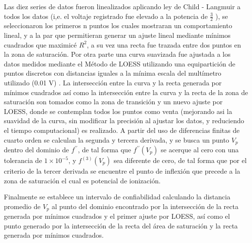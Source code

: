 Las diez series de datos fueron linealizados aplicando ley de Child - Langmuir a todos los datos (i,e. el voltaje registrado fue elevado a la potencia de $\frac{3}{2}$ ), se seleccionaron los primeros n puntos los cuales mostraran un comportamiento lineal, y a la par que permitieran generar un ajuste lineal mediante mínimos cuadrados que maximicé $R^{2}$, a su vez una recta fue trazada entre dos puntos en la zona de saturación. Por otra parte una curva suavizada fue ajustada a los datos medidos mediante el Método de LOESS utilizando una equipartición de puntos discretos con distancias iguales a la mínima escala del multímetro utilizado (0.01 V) . La intersección entre la curva y la recta generada por mínimos cuadrados así como la intersección entre la curva y la recta de la zona de saturación son tomados como la zona de transición y un nuevo ajuste por LOESS, donde se contemplan todos los puntos como venta (mejorando asi la suavidad de la curva, sin modificar la precisión al ajustar los datos, y reduciendo el tiempo computacional) es realizado. A partir del uso de diferencias finitas de cuarto orden se calculan la segunda y tercera derivada, y se busca un punto $V_{p}$ dentro del dominio de $f^{\prime \prime}$, de tal forma que $f^{\prime \prime}(V_{p})$ se acerque al cero con una tolerancia de $1\times10^{-5}$, y  $f^{(3)}(V_{p})$ sea diferente de cero, de tal forma que por el criterio de la tercer derivada se encuentre el punto de inflexión que precede a la zona de saturación el cual es potencial de ionización. 

Finalmente se establece un intervalo de confiabilidad calculando la distancia promedio de $V_{p}$  al punto del dominio encontrado por la intersección de la recta generada por mínimos cuadrados y el primer ajuste por LOESS, así como el punto generado por la intersección de la recta del área de saturación y la recta generada por mínimos cuadrados. 